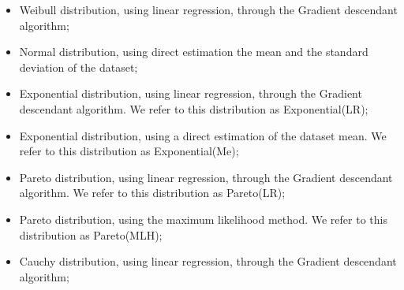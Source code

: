 \begin{itemize}
    \item Weibull distribution, using linear regression, through the Gradient descendant algorithm;
    \item Normal distribution, using direct estimation the mean and the standard deviation of the dataset;
    \item Exponential distribution, using linear regression, through the Gradient descendant algorithm. We refer to this distribution as Exponential(LR);
    \item Exponential distribution, using a direct estimation of the dataset mean. We refer to this distribution as Exponential(Me);
    \item Pareto distribution, using linear regression, through the Gradient descendant algorithm. We refer to this distribution as Pareto(LR);
    \item Pareto distribution, using the maximum likelihood method. We refer to this distribution as Pareto(MLH);
    \item Cauchy distribution, using linear regression, through the Gradient descendant algorithm;
\end{itemize}







